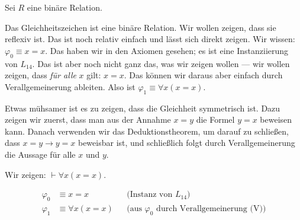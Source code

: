 \begin{math-stroke}
Sei $R$ eine binäre Relation.
\end{math-stroke}

\begin{spoken-clean}[00:54:25 - 00:56:17]
Das Gleichheitszeichen ist eine binäre Relation. Wir wollen zeigen, dass sie reflexiv ist. Das ist noch relativ einfach und lässt sich direkt zeigen. Wir wissen: $\varphi_0 \equiv x = x$. Das haben wir in den Axiomen gesehen; es ist eine Instanziierung von $L_{14}$. Das ist aber noch nicht ganz das, was wir zeigen wollen --- wir wollen zeigen, dass \emph{für alle} $x$ gilt: $x = x$. Das können wir daraus aber einfach durch Verallgemeinerung ableiten. Also ist $\varphi_1 \equiv \forall x (x = x)$.

Etwas mühsamer ist es zu zeigen, dass die Gleichheit symmetrisch ist. Dazu zeigen wir zuerst, dass man aus der Annahme $x = y$ die Formel $y = x$ beweisen kann. Danach verwenden wir das Deduktionstheorem, um darauf zu schließen, dass $x = y \to y = x$ beweisbar ist, und schließlich folgt durch Verallgemeinerung die Aussage für alle $x$ und $y$.
\end{spoken-clean}

\begin{math-stroke}
Wir zeigen: $\vdash \forall x (x = x)$.
\begin{short-proof}
\begin{align*}
\varphi_0 &\equiv x = x && \text{(Instanz von } L_{14}\text{)} \\
\varphi_1 &\equiv \forall x (x = x) && \text{(aus } \varphi_0 \text{ durch Verallgemeinerung (V))}
\end{align*}
\end{short-proof}
\end{math-stroke}

